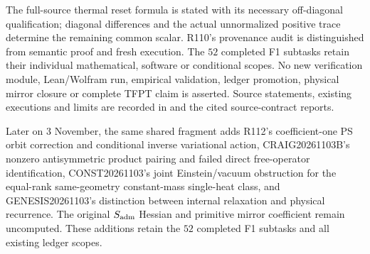 The full-source thermal reset formula is stated with its necessary
off-diagonal qualification; diagonal differences and the actual
unnormalized positive trace determine the remaining common scalar.
R110's provenance audit is distinguished from semantic proof and fresh
execution. The $52$ completed F1 subtasks retain their individual
mathematical, software or conditional scopes. No new verification
module, Lean/Wolfram run, empirical validation, ledger promotion,
physical mirror closure or complete TFPT claim is asserted.
Source statements, existing executions and limits are recorded in
 and the cited
source-contract reports.

Later on 3 November, the same shared fragment adds R112's coefficient-one
PS orbit correction and conditional inverse variational action,
CRAIG20261103B's nonzero antisymmetric product pairing and failed direct
free-operator identification, CONST20261103's joint Einstein/vacuum
obstruction for the equal-rank same-geometry constant-mass single-heat
class, and GENESIS20261103's distinction between internal relaxation and
physical recurrence. The original $S_{\rm adm}$ Hessian and primitive
mirror coefficient remain uncomputed. These additions retain the $52$
completed F1 subtasks and all existing ledger scopes.

